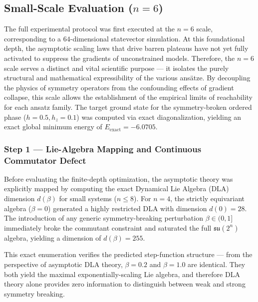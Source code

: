 \documentclass[pdflatex,sn-mathphys-num]{sn-jnl}
\theoremstyle{thmstyleone}
\theoremstyle{thmstyletwo}
\theoremstyle{thmstylethree}
\begin{document}
\vspace{1em}

\subsection{Small-Scale Evaluation (\texorpdfstring{$n=6$}{n=6})}

The full experimental protocol was first executed at the $n=6$ scale, corresponding to a $64$-dimensional statevector simulation. At this foundational depth, the asymptotic scaling laws that drive barren plateaus have not yet fully activated to suppress the gradients of unconstrained models. Therefore, the $n=6$ scale serves a distinct and vital scientific purpose --- it isolates the purely structural and mathematical expressibility of the various ans\"atze. By decoupling the physics of symmetry operators from the confounding effects of gradient collapse, this scale allows the establishment of the empirical limits of reachability for each ansatz family. The target ground state for the symmetry-broken ordered phase ($h=0.5, h_z=0.1$) was computed via exact diagonalization, yielding an exact global minimum energy of $E_{\text{exact}} = -6.0705$.

\subsubsection{Step 1 --- Lie-Algebra Mapping and Continuous Commutator Defect}

Before evaluating the finite-depth optimization, the asymptotic theory was explicitly mapped by computing the exact Dynamical Lie Algebra (DLA) dimension $d(\beta)$ for small systems ($n \le 8$). 
For $n=4$, the strictly equivariant algebra ($\beta=0$) generated a highly restricted DLA with dimension $d(0) = 28$. The introduction of any generic symmetry-breaking perturbation $\beta \in (0, 1]$ immediately broke the commutant constraint and saturated the full $\mathfrak{su}(2^n)$ algebra, yielding a dimension of $d(\beta) = 255$.

This exact enumeration verifies the predicted step-function structure --- from the perspective of asymptotic DLA theory, $\beta=0.2$ and $\beta=1.0$ are identical. They both yield the maximal exponentially-scaling Lie algebra, and therefore DLA theory alone provides zero information to distinguish between weak and strong symmetry breaking.
\end{document}
